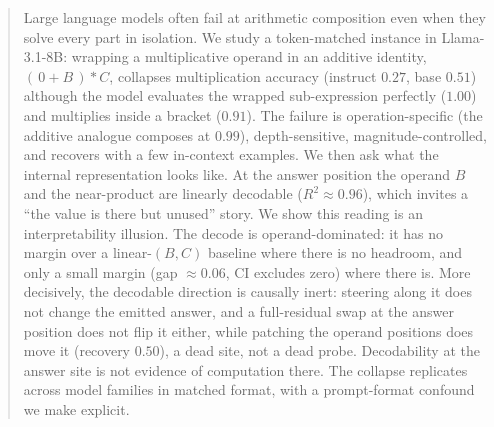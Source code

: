 \begin{abstract}
Large language models often fail at arithmetic composition even when they solve
every part in isolation. We study a token-matched instance in Llama-3.1-8B:
wrapping a multiplicative operand in an additive identity, $(\,0 + B\,) * C$,
collapses multiplication accuracy (instruct $0.27$, base $0.51$) although the model
evaluates the wrapped sub-expression perfectly ($1.00$) and multiplies inside a
bracket ($0.91$). The failure is operation-specific (the additive analogue composes
at $0.99$), depth-sensitive, magnitude-controlled, and recovers with a few in-context
examples. We then ask what the internal representation looks like. At the answer
position the operand $B$ and the near-product \bc{} are linearly decodable
($R^2 \approx 0.96$), which invites a ``the value is there but unused'' story. We
show this reading is an interpretability illusion. The decode is operand-dominated:
it has no margin over a linear-$(B,C)$ baseline where there is no headroom, and only a
small margin (gap $\approx 0.06$, CI excludes zero) where there is. More decisively,
the decodable direction is causally inert: steering along it does not change the
emitted answer, and a full-residual swap at the answer position does not flip it either, while
patching the operand positions does move it (recovery $0.50$), a dead site, not a dead
probe. Decodability at the answer site is not evidence of computation there. The collapse
replicates across model families in matched format, with a prompt-format confound we make
explicit.
\end{abstract}
